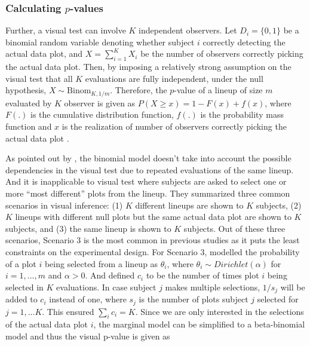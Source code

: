 \documentclass[]{interact}
\theoremstyle{plain}%
\theoremstyle{definition}
\theoremstyle{remark}
\begin{document}
\hypertarget{calculating-p-values}{%
\subsubsection{\texorpdfstring{Calculating
\(p\)-values}{Calculating p-values}}\label{calculating-p-values}}

Further, a visual test can involve \(K\) independent observers. Let
\(D_i = \{0,1\}\) be a binomial random variable denoting whether subject
\(i\) correctly detecting the actual data plot, and
\(X = \sum_{i=1}^{K}X_i\) be the number of observers correctly picking
the actual data plot. Then, by imposing a relatively strong assumption
on the visual test that all \(K\) evaluations are fully independent,
under the null hypothesis, \(X \sim \mathrm{Binom}_{K,1/m}\). Therefore,
the \(p\)-value of a lineup of size \(m\) evaluated by \(K\) observer is
given as \(P(X \geq x) = 1 - F(x) + f(x)\), where \(F(.)\) is the
cumulative distribution function, \(f(.)\) is the probability mass
function and \(x\) is the realization of number of observers correctly
picking the actual data plot \citep{majumder_validation_2013}.

As pointed out by \citet{vanderplas2021statistical}, the binomial model
doesn't take into account the possible dependencies in the visual test
due to repeated evaluations of the same lineup. And it is inapplicable
to visual test where subjects are asked to select one or more ``most
different'' plots from the lineup. They summarized three common
scenarios in visual inference: (1) \(K\) different lineups are shown to
\(K\) subjects, (2) \(K\) lineups with different null plots but the same
actual data plot are shown to \(K\) subjects, and (3) the same lineup is
shown to \(K\) subjects. Out of these three scenarios, Scenario 3 is the
most common in previous studies as it puts the least constraints on the
experimental design. For Scenario 3, \citet{vanderplas2021statistical}
modelled the probability of a plot \(i\) being selected from a lineup as
\(\theta_i\), where \(\theta_i \sim Dirichlet(\alpha)\) for
\(i=1,...,m\) and \(\alpha > 0\). And defined \(c_i\) to be the number
of times plot \(i\) being selected in \(K\) evaluations. In case subject
\(j\) makes multiple selections, \(1/s_j\) will be added to \(c_i\)
instead of one, where \(s_j\) is the number of plots subject \(j\)
selected for \(j=1,...K\). This ensured \(\sum_{i}c_i=K\). Since we are
only interested in the selections of the actual data plot \(i\), the
marginal model can be simplified to a beta-binomial model and thus the
visual p-value is given as
\end{document}
